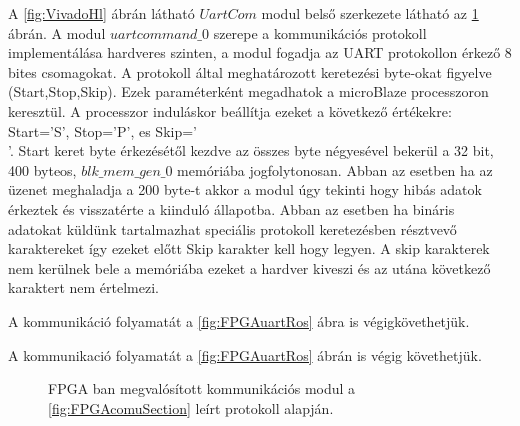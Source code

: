 A \ref{fig:VivadoHl} ábrán látható $UartCom$ modul belső szerkezete látható az \ref{fig:UartComVivaldo} ábrán. A modul $uartcommand\_0$ szerepe a kommunikációs protokoll implementálása hardveres szinten, a modul fogadja az UART protokollon  érkező 8 bites csomagokat. A protokoll által meghatározott keretezési byte-okat figyelve (Start,Stop,Skip). Ezek paraméterként megadhatok a microBlaze processzoron keresztül. A processzor induláskor beállítja ezeket a következő értékekre: Start='S', Stop='P', es Skip='\\'. 
Start keret byte érkezésétől kezdve az összes byte négyesével bekerül a 32 bit, 400 byteos, $blk\_mem\_gen\_0$ memóriába jogfolytonosan. Abban az esetben ha az üzenet meghaladja a 200 byte-t akkor a modul úgy tekinti hogy hibás adatok érkeztek és visszatérte a kiinduló állapotba. Abban az esetben ha bináris adatokat küldünk tartalmazhat speciális protokoll keretezésben résztvevő karaktereket így ezeket előtt Skip karakter kell hogy legyen. A skip karakterek nem kerülnek bele a memóriába ezeket a hardver kiveszi és az utána következő karaktert nem értelmezi.

A kommunikáció folyamatát a \ref{fig:FPGAuartRos} ábra is végigkövethetjük.

A kommunikació  folyamatát a \ref{fig:FPGAuartRos} ábrán is végig követhetjük.

\begin{figure}[H]		
  \caption{FPGA ban megvalósított kommunikációs modul a 	     \ref{fig:FPGAcomuSection} leírt protokoll alapján.}
  \label{fig:UartComVivaldo}
\end{figure}


